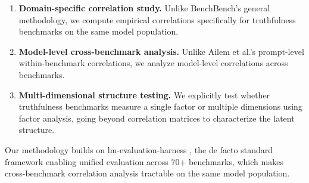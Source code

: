 \begin{enumerate}
\item \textbf{Domain-specific correlation study.} Unlike BenchBench's general methodology, we compute empirical correlations specifically for truthfulness benchmarks on the same model population.

\item \textbf{Model-level cross-benchmark analysis.} Unlike Ailem et al.'s prompt-level within-benchmark correlations, we analyze model-level correlations across benchmarks.

\item \textbf{Multi-dimensional structure testing.} We explicitly test whether truthfulness benchmarks measure a single factor or multiple dimensions using factor analysis, going beyond correlation matrices to characterize the latent structure.
\end{enumerate}

Our methodology builds on lm-evaluation-harness \cite{eleutherai2024lmeval}, the de facto standard framework enabling unified evaluation across 70+ benchmarks, which makes cross-benchmark correlation analysis tractable on the same model population.
